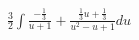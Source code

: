 \documentclass[preview]{standalone}
\begin{document}
\begin{align*}
\frac{3}{2}\int\frac{-\frac{1}{3}}{u+1}+\frac{\frac{1}{3}u+\frac{1}{3}}{u^2-u+1} du
\end{align*}
\end{document}
